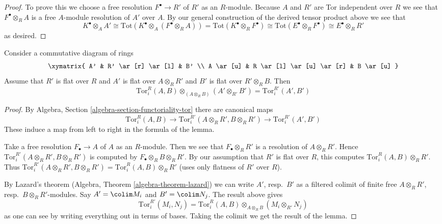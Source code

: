 \begin{proof}
To prove this we choose a free resolution $F^\bullet \to R'$
of $R'$ as an $R$-module. Because $A$ and $R'$ are Tor independent over $R$
we see that $F^\bullet \otimes_R A$ is a free $A$-module resolution of $A'$
over $A$. By our general construction of the derived tensor product
above we see that
$$
K^\bullet \otimes_A A' \cong
\text{Tot}(K^\bullet \otimes_A (F^\bullet \otimes_R A)) =
\text{Tot}(K^\bullet \otimes_R F^\bullet) \cong
\text{Tot}(E^\bullet \otimes_R F^\bullet) \cong
E^\bullet \otimes_R R'
$$
as desired.
\end{proof}

\begin{lemma}
\label{lemma-tor-independent-flat}
Consider a commutative diagram of rings
$$
\xymatrix{
A' & R' \ar[r] \ar[l] & B' \\
A \ar[u] & R \ar[l] \ar[u] \ar[r] & B \ar[u]
}
$$
Assume that $R'$ is flat over $R$ and $A'$ is flat over $A \otimes_R R'$
and $B'$ is flat over $R' \otimes_R B$. Then
$$
\text{Tor}_i^R(A, B) \otimes_{(A \otimes_R B)} (A' \otimes_{R'} B') =
\text{Tor}_i^{R'}(A', B')
$$
\end{lemma}

\begin{proof}
By Algebra, Section \ref{algebra-section-functoriality-tor} there are
canonical maps
$$
\text{Tor}_i^R(A, B) \longrightarrow
\text{Tor}_i^{R'}(A \otimes_R R', B \otimes_R R') \longrightarrow
\text{Tor}_i^{R'}(A', B')
$$
These induce a map from left to right in the formula of the lemma.

\medskip\noindent
Take a free resolution $F_\bullet \to A$ of $A$ as an $R$-module.
Then we see that $F_\bullet \otimes_R R'$ is a resolution of $A \otimes_R R'$.
Hence $\text{Tor}_i^{R'}(A \otimes_R R', B \otimes_R R')$ is computed
by $F_\bullet \otimes_R B \otimes_R R'$. By our assumption that $R'$
is flat over $R$, this computes $\text{Tor}_i^R(A, B) \otimes_R R'$.
Thus $\text{Tor}_i^{R'}(A \otimes_R R', B \otimes_R R') =
\text{Tor}_i^R(A, B) \otimes_R R'$ (uses only flatness of $R'$ over $R$).

\medskip\noindent
By Lazard's theorem (Algebra, Theorem \ref{algebra-theorem-lazard})
we can write $A'$, resp.\ $B'$ as a filtered colimit of finite free
$A \otimes_R R'$, resp.\ $B \otimes_R R'$-modules. Say
$A' = \colim M_i$ and $B' = \colim N_j$. The result above gives
$$
\text{Tor}_i^{R'}(M_i, N_j) =
\text{Tor}_i^R(A, B) \otimes_{A \otimes_R B} (M_i \otimes_{R'} N_j)
$$
as one can see by writing everything out in terms of bases.
Taking the colimit we get the result of the lemma.
\end{proof}

